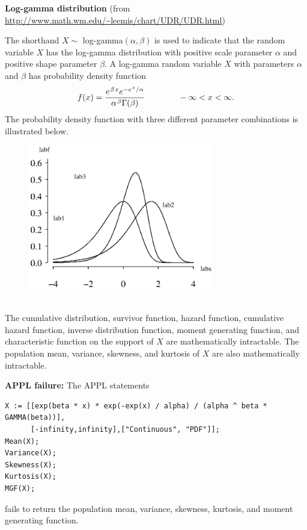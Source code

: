 \documentclass[12pt,fullpage]{article}
\begin{document}
\noindent
{\bf Log-gamma distribution} (from \color{blue}\url{http://www.math.wm.edu/~leemis/chart/UDR/UDR.html}\color{black})

\noindent
The shorthand $X \sim$ log-gamma$(\alpha, \beta)$ is used to indicate that the
random variable $X$ has the log-gamma distribution with positive scale parameter $\alpha$ and positive shape parameter $\beta$.
A log-gamma random variable $X$ with parameters $\alpha$ and $\beta$ has probability density function 
$$
f(x) = \frac{e ^ {\kern 0.08 em \beta \kern 0.08 em x} e ^ {-e ^ {\kern 0.08 em x}/\alpha}} {\alpha ^ {\kern 0.08 em \beta}\Gamma(\beta)}
 \qquad \qquad -\infty < x < \infty.
$$
The probability density function with three different parameter combinations is illustrated below.
{\begin{figure}[h!]
\begin{center}
\includegraphics[width=3.2in]{LoggammaPlot.ps}
\end{center}
\end{figure}}\\
The cumulative distribution, survivor function, hazard function, cumulative hazard 
function, inverse distribution function, moment generating function, and characteristic function
on the support of $X$ are mathematically intractable. The population mean, variance, skewness, and kurtosis of $X$ are also mathematically intractable.

\vspace{0.1in}

\noindent
{\bf APPL failure:}
The APPL statements
\begin{verbatim}
X := [[exp(beta * x) * exp(-exp(x) / alpha) / (alpha ^ beta * GAMMA(beta))],
      [-infinity,infinity],["Continuous", "PDF"]];
Mean(X);
Variance(X);
Skewness(X);
Kurtosis(X);
MGF(X);
\end{verbatim}
fails to return the population mean, variance, skewness, kurtosis, and moment generating function.
\end{document}
